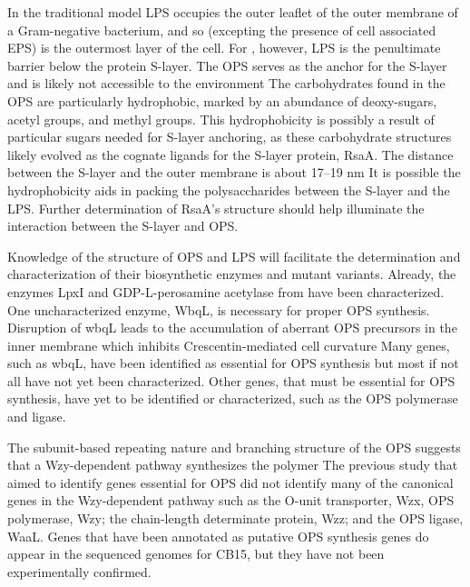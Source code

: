 In the traditional model \ac{LPS} occupies the outer leaflet of the outer membrane of a
Gram-negative bacterium, and so (excepting the presence of cell associated \ac{EPS}) is the
outermost layer of the cell. For \caulobacter, however, \ac{LPS} is the penultimate barrier below
the protein \ac{S-layer}. The \caulobacter{} \ac{OPS} serves as the anchor for the S-layer and is
likely not accessible to the environment The carbohydrates found in the \ac{OPS}
are particularly hydrophobic, marked by an abundance of deoxy-sugars, acetyl groups, and methyl
groups. This hydrophobicity is possibly a result of particular sugars needed for \ac{S-layer}
anchoring, as these carbohydrate structures likely evolved as the cognate ligands for the
\ac{S-layer} protein, RsaA. The distance between the \ac{S-layer} and the outer membrane is about
17--19 nm It is possible the hydrophobicity aids in packing the polysaccharides
between the S-layer and the \ac{LPS}. Further determination of RsaA's structure should help
illuminate the interaction between the S-layer and \ac{OPS}.

Knowledge of the structure of \caulobacter{} \ac{OPS} and \ac{LPS} will facilitate the determination
and characterization of their biosynthetic enzymes and mutant variants. Already, the enzymes
LpxI and GDP-L-perosamine acetylase from
\caulobacter have been characterized. One uncharacterized enzyme, WbqL, is necessary for proper
\ac{OPS} synthesis. Disruption of wbqL leads to the accumulation of aberrant \ac{OPS} precursors in the inner membrane which inhibits Crescentin-mediated cell
curvature Many genes, such as wbqL, have been identified as
essential for \ac{OPS} synthesis but most if not all have not yet been characterized. Other genes, that must be essential for \ac{OPS} synthesis, have yet to be identified or characterized,
such as the \ac{OPS} polymerase and ligase.

The subunit-based repeating nature and branching structure of the \caulobacter{} \ac{OPS} suggests that a Wzy-dependent pathway
synthesizes the polymer The previous study that aimed to identify genes
essential for \ac{OPS} did not identify many of the canonical genes in the Wzy-dependent
pathway such as the O-unit transporter, Wzx, \ac{OPS} polymerase, Wzy; the
chain-length determinate protein, Wzz; and the \ac{OPS} ligase, WaaL. Genes that have been
annotated as putative \ac{OPS} synthesis genes do appear in the sequenced genomes for \caulobacter
CB15, but they have not been experimentally confirmed.


